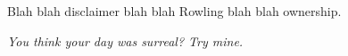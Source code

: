 Blah blah disclaimer blah blah Rowling blah blah ownership.

\emph{You think your day was surreal? Try mine.}

